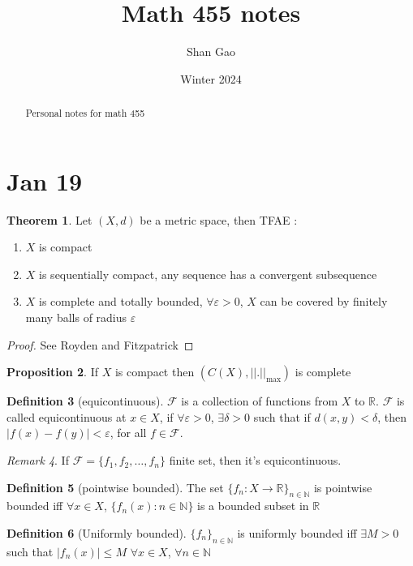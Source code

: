 \documentclass[13pt]{article}
\title{Math 455 notes}
\author{Shan Gao}
\date{Winter 2024}  %
\theoremstyle{definition} --- default
\newtheorem{theorem}{Theorem}
\newtheorem{proposition}[theorem]{Proposition}
\theoremstyle{definition}
\newtheorem{definition}[theorem]{Definition}
\theoremstyle{remark}
\newtheorem{remark}[theorem]{Remark}
\begin{document}
\maketitle
\begin{abstract}
    Personal notes for math 455
\end{abstract}



\section{Jan 19}
\begin{theorem}
	Let $(X,d)$ be a metric space, then TFAE : 
	\begin{enumerate}
		\item $X$ is compact
		\item $X$ is sequentially compact, any sequence has a convergent subsequence
		\item $X$ is complete and totally bounded, $\forall \varepsilon >0$, $X$ can be covered by finitely many balls of radius $\varepsilon$
	\end{enumerate}	
\end{theorem}
\begin{proof}
	See Royden and Fitzpatrick
\end{proof}

\begin{proposition}
	If $X$ is compact then $(C(X), ||.||_{\text{max}})$ is complete
\end{proposition}

\begin{definition}[equicontinuous]
	$\mathcal{F}$ is a collection of functions from $X$ to $\mathbb{R}$. $\mathcal{F}$ is called equicontinuous at $x \in X$, if $\forall \varepsilon > 0$, $\exists \delta > 0$ such that if $d(x,y) < \delta$, then $|f(x) - f(y)| < \varepsilon$, for all $f \in \mathcal{F}$. 
\end{definition}

\begin{remark}
	If $\mathcal{F} = \{f_1,f_2,\ldots,f_n\}$ finite set, then it's equicontinuous. 
\end{remark}
\begin{definition}[pointwise bounded]
	The set $\{f_n \colon X \to \mathbb{R}\}_{n \in \mathbb{N}}$ is pointwise bounded iff $\forall x \in X$, $\{f_n(x) \colon n \in \mathbb{N}\}$ is a bounded subset in $\mathbb{R}$ 
\end{definition}


\begin{definition}[Uniformly bounded]
	$\{f_n\}_{n \in \mathbb{N}}$ is uniformly bounded iff $\exists M > 0$ such that $|f_n(x)| \leq M$ $\forall x \in X$, $\forall n \in \mathbb{N}$ 
\end{definition}
\end{document}
